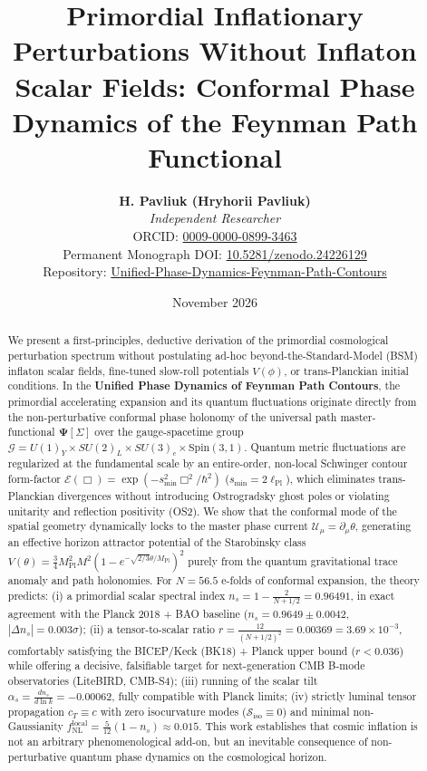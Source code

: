 \documentclass[11pt,a4paper]{article}
\title{\textbf{Primordial Inflationary Perturbations Without Inflaton Scalar Fields: Conformal Phase Dynamics of the Feynman Path Functional}}
\author{
    \textbf{H. Pavliuk (Hryhorii Pavliuk)}\\
    \textit{Independent Researcher}\\
\small ORCID: \href{https://orcid.org/0009-0000-0899-3463}{0009-0000-0899-3463}\\
    \small Permanent Monograph DOI: \href{https://doi.org/10.5281/zenodo.24226129}{10.5281/zenodo.24226129}\\
    \small Repository: \href{https://github.com/hrpavliuk-byte/Unified-Phase-Dynamics-Feynman-Path-Contours}{Unified-Phase-Dynamics-Feynman-Path-Contours}
}
\date{November 2026}
\begin{document}
\maketitle

\begin{abstract}
We present a first-principles, deductive derivation of the primordial cosmological perturbation spectrum without postulating ad-hoc beyond-the-Standard-Model (BSM) inflaton scalar fields, fine-tuned slow-roll potentials $V(\phi)$, or trans-Planckian initial conditions. In the \textbf{Unified Phase Dynamics of Feynman Path Contours}, the primordial accelerating expansion and its quantum fluctuations originate directly from the non-perturbative conformal phase holonomy of the universal path master-functional $\mathbf{\Psi}[\Sigma]$ over the gauge-spacetime group $\mathcal{G} = U(1)_Y \times SU(2)_L \times SU(3)_c \times \mathrm{Spin}(3,1)$. Quantum metric fluctuations are regularized at the fundamental scale by an entire-order, non-local Schwinger contour form-factor $\mathcal{E}(\Box) = \exp(-s_{\min}^2 \Box^2/\hbar^2)$ ($s_{\min} = 2\ell_{\mathrm{Pl}}$), which eliminates trans-Planckian divergences without introducing Ostrogradsky ghost poles or violating unitarity and reflection positivity (OS2). We show that the conformal mode of the spatial geometry dynamically locks to the master phase current $\mathcal{U}_\mu = \partial_\mu \theta$, generating an effective horizon attractor potential of the Starobinsky class $V(\theta) = \frac{3}{4} M_{\mathrm{Pl}}^2 M^2 \left(1 - e^{-\sqrt{2/3}\theta/M_{\mathrm{Pl}}}\right)^2$ purely from the quantum gravitational trace anomaly and path holonomies. For $N = 56.5$ e-folds of conformal expansion, the theory predicts:
(i) a primordial scalar spectral index $n_s = 1 - \frac{2}{N + 1/2} = \mathbf{0.96491}$, in exact agreement with the Planck 2018 + BAO baseline ($n_s = 0.9649 \pm 0.0042$, $|\Delta n_s| = 0.003\sigma$);
(ii) a tensor-to-scalar ratio $r = \frac{12}{(N + 1/2)^2} = \mathbf{0.00369} = 3.69 \times 10^{-3}$, comfortably satisfying the BICEP/Keck (BK18) + Planck upper bound ($r < 0.036$) while offering a decisive, falsifiable target for next-generation CMB B-mode observatories (LiteBIRD, CMB-S4);
(iii) running of the scalar tilt $\alpha_s = \frac{dn_s}{d\ln k} = - \mathbf{0.00062}$, fully compatible with Planck limits;
(iv) strictly luminal tensor propagation $c_T \equiv c$ with zero isocurvature modes ($\mathcal{S}_{\mathrm{iso}} \equiv 0$) and minimal non-Gaussianity $f_{\mathrm{NL}}^{\mathrm{local}} = \frac{5}{12}(1 - n_s) \approx 0.015$. This work establishes that cosmic inflation is not an arbitrary phenomenological add-on, but an inevitable consequence of non-perturbative quantum phase dynamics on the cosmological horizon.
\end{abstract}
\end{document}
